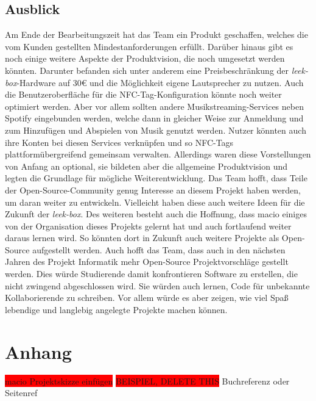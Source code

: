 \documentclass[10pt, a4paper]{article}
\begin{document}
\begin{onehalfspace}
\subsection{Ausblick}
Am Ende der Bearbeitungszeit hat das Team ein Produkt geschaffen, welches die vom Kunden gestellten Mindestanforderungen erfüllt.
Darüber hinaus gibt es noch einige weitere Aspekte der Produktvision, die noch umgesetzt werden könnten.
Darunter befanden sich unter anderem eine Preisbeschränkung der \textit{leek-box}-Hardware auf 30€ und die Möglichkeit eigene Lautsprecher zu nutzen.
Auch die Benutzeroberfläche für die NFC-Tag-Konfiguration könnte noch weiter optimiert werden.
Aber vor allem sollten andere Musikstreaming-Services neben Spotify eingebunden werden,
welche dann in gleicher Weise zur Anmeldung und zum Hinzufügen und Abspielen von Musik genutzt werden.
Nutzer könnten auch ihre Konten bei diesen Services verknüpfen und so NFC-Tags plattformübergreifend gemeinsam verwalten.
Allerdings waren diese Vorstellungen von Anfang an optional, sie bildeten aber die allgemeine Produktvision und legten die Grundlage für mögliche Weiterentwicklung.
Das Team hofft, dass Teile der Open-Source-Community genug Interesse an diesem Projekt haben werden, um daran weiter zu entwickeln.
Vielleicht haben diese auch weitere Ideen für die Zukunft der \textit{leek-box}.
Des weiteren besteht auch die Hoffnung, dass macio einiges von der Organisation dieses Projekts gelernt hat und auch fortlaufend weiter daraus lernen wird.
So könnten dort in Zukunft auch weitere Projekte als Open-Source aufgestellt werden.
Auch hofft das Team, dass auch in den nächsten Jahren des \glqq Projekt Informatik \grqq{} mehr Open-Source Projektvorschläge gestellt werden.
Dies würde Studierende damit konfrontieren Software zu erstellen, die nicht zwingend abgeschlossen wird.
Sie würden auch lernen, Code für unbekannte Kollaborierende zu schreiben.
Vor allem würde es aber zeigen, wie viel Spaß lebendige und langlebig angelegte Projekte machen können.

\end{onehalfspace}

\newpage
\section{Anhang}
\colorbox{red}{macio Projektskizze einfügen} \label{pdf:macioprojektskizze}
\label{FigmaDesigns}
\label{FlowCharts}
\colorbox{red}{BEISPIEL, DELETE THIS} Buchreferenz \cite{Literaturbeispiel:tom} oder Seitenref \cite{google}
\printbibliography
\end{document}
